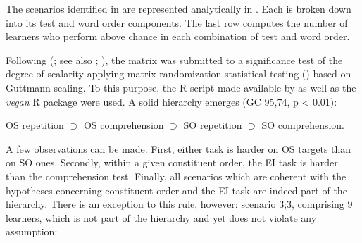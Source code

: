 The scenarios identified in  are represented analytically in . Each is broken down into its test and word order components. The last row computes the number of learners who perform above chance in each combination of test and word order. 

\begin{table}
    \caption{Implicational hierarchy at T1}
    \label{tab:06:4}
\end{table}

Following \citeauthor{AldaiWichmann2018} (\citeyear{AldaiWichmann2018}; see also \citealt{Nyqvist2018, Wichmann2015, Wichmann2016}; \citealt[210-212]{HatchLazaraton1991}), the matrix was submitted to a significance test of the degree of scalarity applying matrix randomization statistical testing (\citealt{JanssenEtAl2006}) based on Guttmann scaling. To this purpose, the R script made available by \citet{AldaiWichmann2018} as well as the \textit{vegan} R package \citep{OksanenEtAl2019} were used. A solid hierarchy emerges (GC 95,74, p < 0.01): 

OS repetition ${\supset}$ OS comprehension ${\supset}$ SO repetition ${\supset}$ SO comprehension. 

A few observations can be made. First, either task is harder on OS targets than on SO ones. Secondly, within a given constituent order, the EI task is harder than the comprehension test. Finally, all scenarios which are coherent with the hypotheses concerning constituent order and the EI task are indeed part of the hierarchy. There is an exception to this rule, however: scenario 3;3, comprising 9 learners, which is not part of the hierarchy and yet does not violate any assumption:

